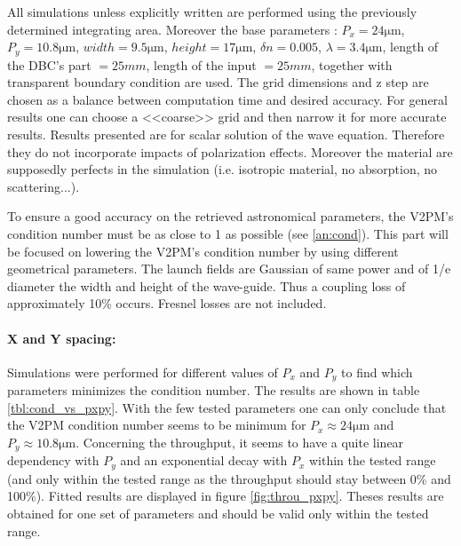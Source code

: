 All simulations unless explicitly written are performed using the previously determined integrating area. Moreover the base parameters : $P_x=24\si{\micro\meter}$, $P_y=10.8\si{\micro\meter}$,
$width=9.5\si{\micro\meter}$, $height=17\si{\micro\meter}$, $\delta n
= 0.005$, $\lambda=3.4\si{\micro\meter}$, length of the DBC's part $= 25mm$, length of the input $=25mm$, together with transparent boundary
condition are used. The grid dimensions and z step are chosen as a balance between computation time and desired accuracy. For general results one can
choose a <<coarse>> grid and then narrow it for more accurate results.
Results presented are for scalar solution of the wave equation. Therefore
they do not incorporate impacts of polarization effects. Moreover the material are supposedly
perfects in the simulation (i.e. isotropic material, no absorption, no scattering...).

To ensure a good accuracy on the retrieved astronomical parameters,
the V2PM's condition number must be as close to 1 as possible (see
\ref{an:cond}). This part will be focused on lowering the V2PM's
condition number by using different geometrical parameters. 
The launch fields are Gaussian of same power and of 1/e diameter the
width and height of the wave-guide. Thus a coupling loss of
approximately 10\% occurs. Fresnel losses are not included.

\paragraph{X and Y spacing:}
Simulations were performed for different values of $P_x$ and $P_y$ to
find which parameters minimizes the condition number. The results are
shown in table \ref{tbl:cond_vs_pxpy}. With the few tested parameters
one can only conclude that the V2PM condition number seems to be minimum for $P_x \approx 24 \si{\micro\meter}$ and $P_y \approx
10.8 \si{\micro\meter}$. Concerning the throughput, it seems to have a
quite linear dependency with $P_y$ and an exponential decay with $P_x$ within the tested
range (and only within the tested range as the throughput should stay between 0\% and 100\%). Fitted results are displayed in figure
\ref{fig:throu_pxpy}. Theses results are obtained for one set of
parameters and should be valid only within the tested range.

